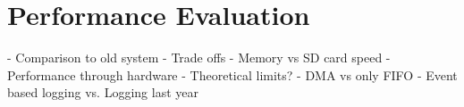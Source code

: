 
\chapter{Performance Evaluation}

- Comparison to old system
- Trade offs
- Memory vs SD card speed
- Performance through hardware
- Theoretical limits?
- DMA vs only FIFO
- Event based logging vs. Logging last year
